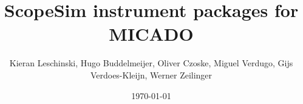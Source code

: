 \documentclass[a4paper,11pt]{article}
\providecommand*{\DUdocumentsubtitle}[1]{{\large #1}}
\begin{document}
\title{ScopeSim instrument packages for MICADO%
  \label{title}%
  \\%
  \DUdocumentsubtitle{}%
  \label{subtitle}}
\author{Kieran Leschinski,
        Hugo Buddelmeijer,
        Oliver Czoske,
        Miguel Verdugo,
        Gijs Verdoes-Kleijn,
        Werner Zeilinger}
\date{\today}

\maketitle

\tableofcontents















\end{document}
